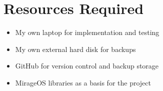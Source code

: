\documentclass[12pt,a4paper,twoside]{article}
\begin{document}
\section*{Resources Required}

\begin{itemize}

	\item My own laptop for implementation and testing

	\item My own external hard disk for backups

	\item GitHub for version control and backup storage

	\item MirageOS libraries as a basis for the project

\end{itemize}


\end{document}
